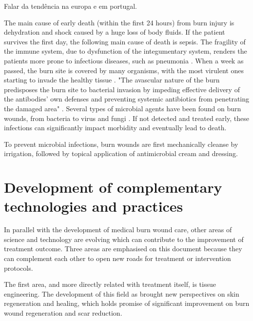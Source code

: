 Falar da tendência na europa e em portugal.

\bigskip
The main cause of early death (within the first 24 hours) from burn injury is dehydration and shock caused by a huge loss of body fluids. If the patient survives the first day, the following main cause of death is sepsis. The fragility of the immune system, due to dysfunction of the integumentary system, renders the patients more prone to infectious diseases, such as pneumonia \cite{who2011_sucess_stories}. When a week as passed, the burn site is covered by many organisms, with the most virulent ones starting to invade the healthy tissue \cite{isbi_guidelines_burn_care}. "The avascular nature of the burn predisposes the burn site to bacterial invasion by impeding effective delivery of the antibodies’ own defenses and preventing systemic antibiotics from penetrating the damaged area" \cite{isbi_guidelines_burn_care}. Several types of microbial agents have been found on burn wounds, from bacteria to virus and fungi \cite{Schaal2015a_fungal_infections,Shoja2017_acinetobacter}. If not detected and treated early, these infections can significantly impact morbidity and eventually lead to death.

To prevent microbial infections, burn wounds are first mechanically cleanse by irrigation, followed by topical application of antimicrobial cream and dressing. 




\section{Development of complementary technologies and practices} %
\label{sec:development_of_complementary_technologies_and_practices}

In parallel with the development of medical burn wound care, other areas of science and technology are evolving which can contribute to the improvement of treatment outcome. Three areas are emphasised on this document because they can complement each other to open new roads for treatment or intervention protocols.

The first area, and more directly related with treatment itself, is tissue engineering. The development of this field as brought new perspectives on skin regeneration and healing, which holds promise of significant improvement on burn wound regeneration and scar reduction. 

